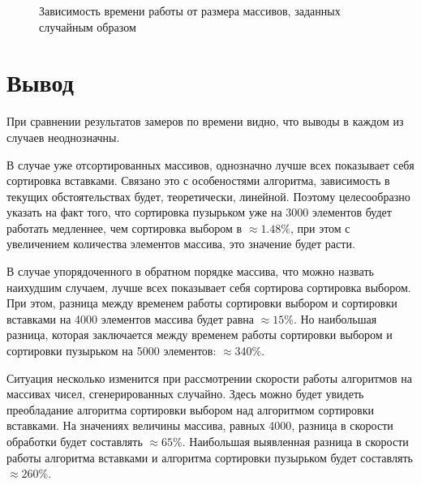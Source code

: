 \documentclass[12pt]{report}
\begin{document}
\begin{figure}[h]
\begin{center}
	\captionsetup{justification=centering}
	\caption{Зависимость времени работы от размера массивов, заданных случайным образом}
	\label{timeRes3}
	\end{center}
\end{figure}

\section*{Вывод}
При сравнении результатов замеров по времени видно, что выводы в каждом из случаев неоднозначны.

В случае уже отсортированных массивов, однозначно лучше всех показывает себя сортировка вставками. Связано это с особеностями алгоритма, зависимость в текущих обстоятельствах будет, теоретически, линейной. Поэтому целесообразно указать на факт того, что сортировка пузырьком уже на 3000 элементов будет работать медленнее, чем сортировка выбором в  $\approx 1.48 \%$, при этом с увеличением количества элементов массива, это значение будет расти.

В случае упорядоченного в обратном порядке массива, что можно назвать наихудшим случаем, лучше всех показывает себя сортирова сортировка выбором. При этом, разница между временем работы сортировки выбором и сортировки вставками на 4000 элементов массива будет равна $\approx 15\%$. Но наибольшая разница, которая заключается между временем работы сортировки выбором и сортировки пузырьком на 5000 элементов: $\approx 340\%$.

Ситуация несколько изменится при рассмотрении скорости работы алгоритмов на массивах чисел, сгенерированных случайно. Здесь можно будет увидеть преобладание алгоритма сортировки выбором над алгоритмом сортировки вставками. На значениях величины массива, равных 4000, разница в скорости обработки будет составлять $\approx 65\%$. Наибольшая выявленная разница в скорости работы алгоритма вставками и алгоритма сортировки пузырьком будет составлять $\approx 260\%$.
\end{document}
